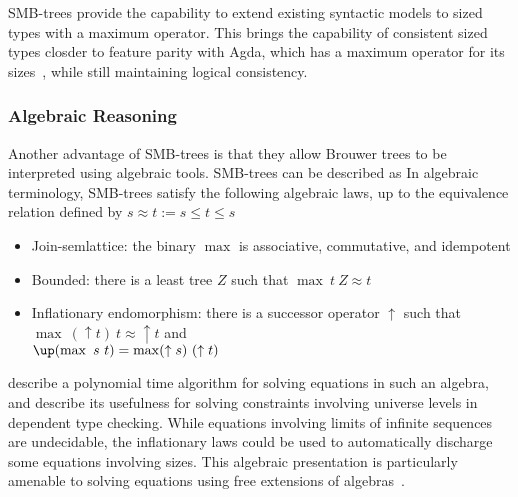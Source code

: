 SMB-trees provide the capability to extend existing syntactic models to sized types
with a maximum operator.
This brings the capability of consistent sized types closder to feature parity with Agda,
which has a maximum operator for its sizes~\citep{TODO}, while still maintaining logical consistency.

\subsubsection{Algebraic Reasoning}
Another advantage of SMB-trees is that they allow Brouwer trees to
be interpreted using algebraic tools.
SMB-trees can be described as
In algebraic terminology, SMB-trees satisfy the following algebraic laws, up to the equivalence relation defined by $s \approx t := s \le t \le s $
\begin{itemize}
  \item Join-semlattice: the binary $\max$ is associative, commutative, and idempotent
  \item Bounded: there is a least tree $Z$ such that $\max\ t\ Z \approx t$
  \item Inflationary endomorphism: there is a successor operator $\uparrow$
        such that ${\max\ (\uparrow t)\ t \approx \uparrow t}$
        and\\ ${\up (\max\ s\ t) = \max (\uparrow s)\ (\uparrow t)}$
\end{itemize}

 describe a polynomial time algorithm for solving equations in such an algebra,
and describe its usefulness for solving constraints involving universe levels
in dependent type checking. While equations involving limits of infinite sequences
are undecidable, the inflationary laws could be used to automatically discharge some equations involving sizes. This algebraic presentation is particularly
amenable to solving equations using free extensions of algebras~\citep{corbyn:proof-synthesis,TODO}.



